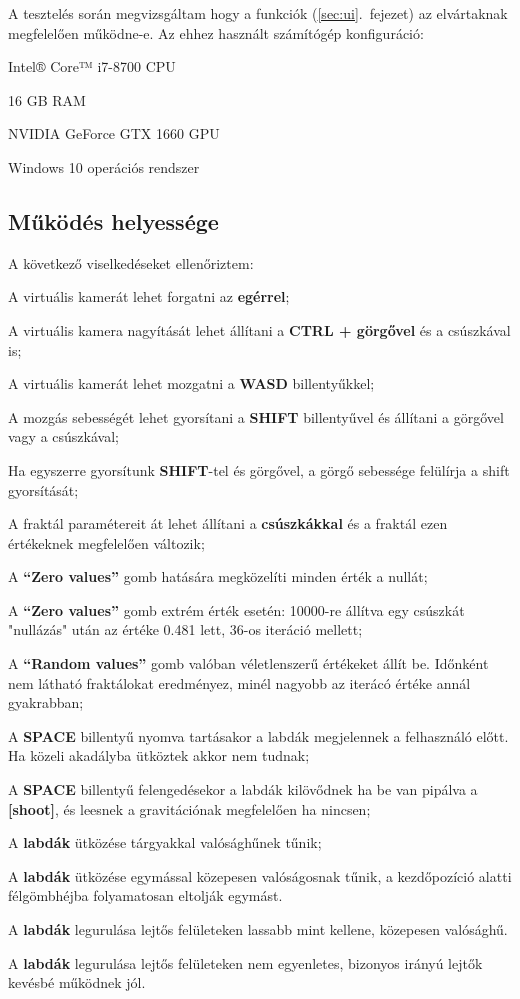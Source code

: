 A tesztelés során megvizsgáltam hogy a funkciók (\ref{sec:ui}.~fejezet) az elvártaknak megfelelően működne-e. Az ehhez használt számítógép konfiguráció:
\begin{compactitem}
	\item Intel® Core™ i7-8700 CPU
	\item 16 GB RAM
	\item NVIDIA GeForce GTX 1660 GPU
	\item Windows 10 operációs rendszer
\end{compactitem}

\cleardoublepage
\subsection{Működés helyessége}

A következő viselkedéseket ellenőriztem:
\begin{compactenum}
	\item A virtuális kamerát lehet forgatni az \textbf{egérrel};
	\item A virtuális kamera nagyítását lehet állítani a \textbf{CTRL + görgővel} és a csúszkával is;
	\item A virtuális kamerát lehet mozgatni a \textbf{WASD} billentyűkkel;
	\item A mozgás sebességét lehet gyorsítani a \textbf{SHIFT} billentyűvel és állítani a görgővel vagy a csúszkával;
	\item Ha egyszerre gyorsítunk \textbf{SHIFT}-tel és görgővel, a görgő sebessége felülírja a shift gyorsítását;
	\item A fraktál paramétereit át lehet állítani a \textbf{csúszkákkal} és a fraktál ezen értékeknek megfelelően változik;
	\item A \textbf{``Zero values''} gomb hatására megközelíti minden érték a nullát;
	\item A \textbf{``Zero values''} gomb extrém érték esetén: 10000-re állítva egy csúszkát "nullázás" után az értéke 0.481 lett, 36-os iteráció mellett;
	\item A \textbf{``Random values''} gomb valóban véletlenszerű értékeket állít be. Időnként nem látható fraktálokat eredményez, minél nagyobb az iterácó értéke annál gyakrabban;
	\item A \textbf{SPACE} billentyű nyomva tartásakor a labdák megjelennek a felhasználó előtt. Ha közeli akadályba ütköztek akkor nem tudnak;
	\item A \textbf{SPACE} billentyű felengedésekor a labdák kilövődnek ha be van pipálva a \textbf{[shoot]}, és leesnek a gravitációnak megfelelően ha nincsen;
	\item A \textbf{labdák} ütközése tárgyakkal valósághűnek tűnik;
	\item A \textbf{labdák} ütközése egymással közepesen valóságosnak tűnik, a kezdőpozíció alatti félgömbhéjba folyamatosan eltolják egymást.
	\item A \textbf{labdák} legurulása lejtős felületeken lassabb mint kellene, közepesen valósághű.
	\item A \textbf{labdák} legurulása lejtős felületeken nem egyenletes, bizonyos irányú lejtők kevésbé működnek jól.
\end{compactenum}

